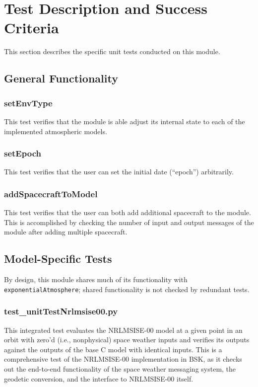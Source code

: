 
\section{Test Description and Success Criteria}
This section describes the specific unit tests conducted on this module.

\subsection{General Functionality}
\subsubsection{setEnvType}

This test verifies that the module is able adjust its internal state to each of the implemented atmospheric models.

\subsubsection{setEpoch}

This test verifies that the user can set the initial date (``epoch'') arbitrarily.

\subsubsection{addSpacecraftToModel}

This test verifies that the user can both add additional spacecraft to the module. This is accomplished by checking the number of input and output messages of the module after adding multiple spacecraft.

\subsection{Model-Specific Tests}

By design, this module shares much of its functionality with \verb|exponentialAtmosphere|; shared functionality is not checked by redundant tests.

\subsubsection{test\_unitTestNrlmsise00.py}
This integrated test evaluates the NRLMSISE-00 model at a given point in an orbit with zero'd (i.e., nonphysical) space weather inputs and verifies its outputs against the outputs of the base C model with identical inputs. This is a comprehensive test of the NRLMSISE-00 implementation in BSK, as it checks out the end-to-end functionality of the space weather messaging system, the geodetic conversion, and the interface to NRLMSISE-00 itself.

